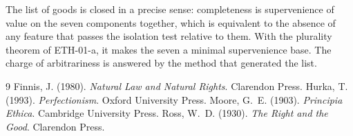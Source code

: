 \documentclass{situationist-preprint}
\begin{document}
The list of goods is closed in a precise sense: completeness is supervenience of value on the seven components together, which is equivalent to the absence of any feature that passes the isolation test relative to them. With the plurality theorem of ETH-01-a, it makes the seven a minimal supervenience base. The charge of arbitrariness is answered by the method that generated the list.

\begin{thebibliography}{9}\small
{} Finnis, J. (1980). \emph{Natural Law and Natural Rights}. Clarendon Press.
 Hurka, T. (1993). \emph{Perfectionism}. Oxford University Press.
 Moore, G.~E. (1903). \emph{Principia Ethica}. Cambridge University Press.
 Ross, W.~D. (1930). \emph{The Right and the Good}. Clarendon Press.
\end{thebibliography}
\end{document}
